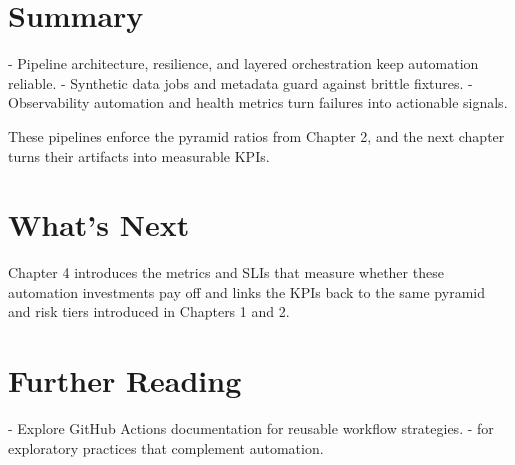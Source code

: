 \section{Summary}

- Pipeline architecture, resilience, and layered orchestration keep automation reliable.
- Synthetic data jobs and metadata guard against brittle fixtures.
- Observability automation and health metrics turn failures into actionable signals.

These pipelines enforce the pyramid ratios from Chapter 2, and the next chapter turns their artifacts into measurable KPIs.

\section{What's Next}

Chapter 4 introduces the metrics and SLIs that measure whether these automation investments pay off and links the KPIs back to the same pyramid and risk tiers introduced in Chapters 1 and 2.

\section{Further Reading}

- Explore GitHub Actions documentation for reusable workflow strategies.
- \citep{kaner2002testing} for exploratory practices that complement automation.
